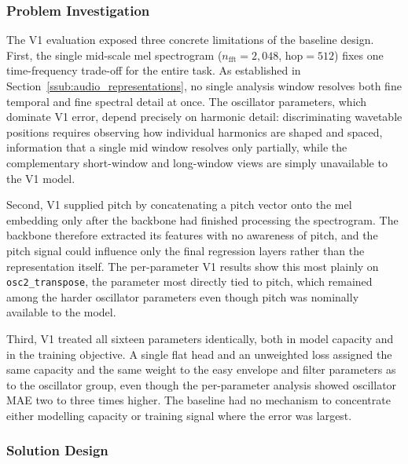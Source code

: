 \subsubsection{Problem Investigation}

\noindent
The V1 evaluation exposed three concrete limitations of the baseline design. First, the single mid-scale mel spectrogram ($n_{\text{fft}}=2{,}048$, hop$=512$) fixes one time-frequency trade-off for the entire task. As established in Section~\ref{ssub:audio_representations}, no single analysis window resolves both fine temporal and fine spectral detail at once. The oscillator parameters, which dominate V1 error, depend precisely on harmonic detail: discriminating wavetable positions requires observing how individual harmonics are shaped and spaced, information that a single mid window resolves only partially, while the complementary short-window and long-window views are simply unavailable to the V1 model.

\noindent \newline
Second, V1 supplied pitch by concatenating a pitch vector onto the mel embedding only after the backbone had finished processing the spectrogram. The backbone therefore extracted its features with no awareness of pitch, and the pitch signal could influence only the final regression layers rather than the representation itself. The per-parameter V1 results show this most plainly on \texttt{osc2\_transpose}, the parameter most directly tied to pitch, which remained among the harder oscillator parameters even though pitch was nominally available to the model.

\noindent \newline
Third, V1 treated all sixteen parameters identically, both in model capacity and in the training objective. A single flat head and an unweighted loss assigned the same capacity and the same weight to the easy envelope and filter parameters as to the oscillator group, even though the per-parameter analysis showed oscillator MAE two to three times higher. The baseline had no mechanism to concentrate either modelling capacity or training signal where the error was largest.

\subsubsection{Solution Design}

